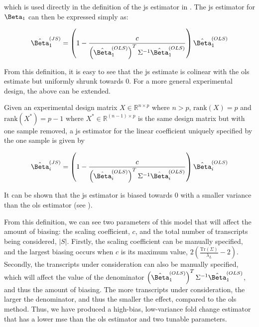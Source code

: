 which is used directly in the definition of the \gls{js} estimator in .
The \gls{js} estimator for $\Beta_1$ can then be expressed simply as:

\begin{equation}
  \hat{\Beta}_1^{(JS)} = \left( 1 - \frac{c}{\left( \hat{\Beta}_1^{(OLS)} \right)^T \Sigma^{-1} \hat{\Beta}_1^{(OLS)}} \right) \hat{\Beta}_1^{(OLS)}
  \label{eqn:js_defn_ols}
\end{equation}

From this definition, it is easy to see that the \gls{js} estimate is colinear with the \gls{ols} estimate but uniformly shrunk towards 0.
For a more general experimental design, the above can be extended.

\begin{theorem}
  Given an experimental design matrix $X \in \mathbb{R}^{n \times p}$ where $n > p$, $\text{rank}(X) = p$ and $\text{rank}(X^*) = p - 1$ where $X^* \in \mathbb{R}^{(n - 1) \times p}$ is the same design matrix but with one sample removed, a \gls{js} estimator for the linear coefficient uniquely specified by the one sample is given by

  \begin{equation*}
    \hat{\Beta}_i^{(JS)} = \left( 1 - \frac{c}{\left( \hat{\Beta}_i^{(OLS)} \right)^T \Sigma^{-1} \hat{\Beta}_i^{(OLS)}} \right) \hat{\Beta}_i^{(OLS)}
  \end{equation*}
\end{theorem}

It can be shown that the \gls{js} estimator is biased towards 0 with a smaller variance than the \gls{ols} estimator (see ).

From this definition, we can see two parameters of this model that will affect the amount of biasing: the scaling coefficient, $c$, and the total number of transcripts being considered, $|S|$.
Firstly, the scaling coefficient can be manually specified, and the largest biasing occurs when $c$ is its maximum value, $2 \left( \frac{\text{Tr}(\Sigma)}{\lambda_L} - 2 \right)$.
Secondly, the transcripts under consideration can also be manually specified, which will affect the value of the denominator $\left( \hat{\Beta}_1^{(OLS)} \right)^T \Sigma^{-1} \hat{\Beta}_1^{(OLS)}$, and thus the amount of biasing.
The more transcripts under consideration, the larger the denominator, and thus the smaller the effect, compared to the \gls{ols} method.
Thus, we have produced a high-bias, low-variance fold change estimator that has a lower \gls{mse} than the \gls{ols} estimator and two tunable parameters.

